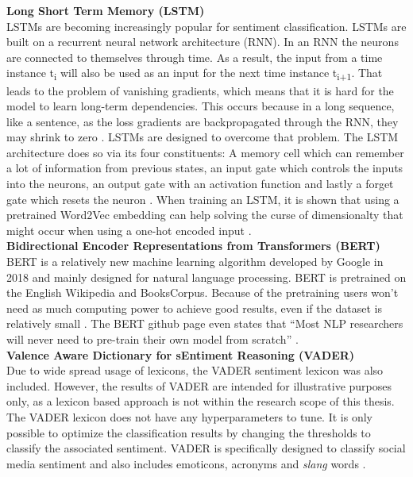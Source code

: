 \documentclass[11pt, a4paper]{article}
\begin{document}
\noindent\textbf{Long Short Term Memory (LSTM)}\\
LSTMs are becoming increasingly popular for sentiment classification. 
LSTMs are built on a recurrent neural network architecture (RNN). In an RNN the neurons are connected to themselves through time. 
As a result, the input from a time instance t\textsubscript{i} will also be used as an input for the next time instance t\textsubscript{i+1}. That leads to the 
problem of vanishing gradients, which means that it is hard for the model to learn long-term dependencies. This occurs because
in a long sequence, like a sentence, as the loss gradients are backpropagated through the RNN, they may shrink to zero \citep{vanishinggradients2020pmlr}.
LSTMs are designed to overcome that problem.
The LSTM architecture does so via its four constituents: A memory cell which can remember a lot of information 
from previous states, an input gate which controls the inputs into the neurons, an output gate with an activation function 
and lastly a forget gate which resets the neuron \citep{priyantina2019sentimentanalysishotel}. When training an LSTM, it is shown that
using a pretrained Word2Vec embedding can help solving the curse of dimensionalty that might occur when using a one-hot encoded input \citep{xiao2018word2veclstm}.\\

\noindent\textbf{Bidirectional Encoder Representations from Transformers (BERT)}\\
BERT is a relatively new machine learning algorithm developed by Google in 2018 and mainly designed for 
natural language processing. BERT is pretrained on the English Wikipedia and BooksCorpus. Because of the 
pretraining users won't need as much computing power to achieve good results, even if the dataset is relatively 
small \citep{devlin2019bert}. The BERT github page even states that 
“Most NLP researchers will never need to pre-train their own model from scratch” \citep{googlegithub}.\\

\noindent\textbf{Valence Aware Dictionary for sEntiment Reasoning (VADER)}\\
Due to wide spread usage of lexicons, the VADER sentiment lexicon was also included. However, the results of VADER are intended for illustrative purposes only,
as a lexicon based approach is not within the research scope of this thesis.
The VADER lexicon does not have any hyperparameters to tune. It is only possible to optimize the classification results by
changing the thresholds to classify the associated sentiment.
VADER is specifically designed to classify social media sentiment and also includes emoticons, acronyms and \emph{slang} words \citep{hutto2015vader}. \\
\end{document}
